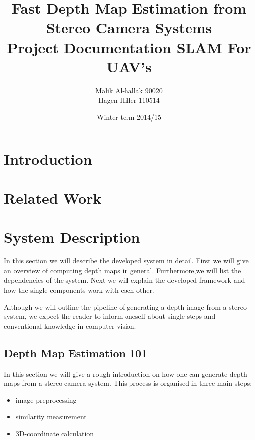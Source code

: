 \documentclass[11pt]{article}
\title{\textbf{Fast Depth Map Estimation from Stereo Camera Systems}\\Project Documentation SLAM For UAV's}
\author{Malik Al-hallak 90020\\
		Hagen Hiller 110514 }
\date{Winter term 2014/15}
\begin{document}
\maketitle



\section{Introduction}
\section{Related Work}
\section{System Description}
In this section we will describe the developed system in detail. First we will give an overview of computing depth maps in general. Furthermore,we will list the dependencies of the system. Next we will explain the developed framework and how the single components work with each other.

Although we will outline the pipeline of generating a depth image from a stereo system, we expect the reader to inform oneself about single steps and conventional knowledge in computer vision.

\subsection{Depth Map Estimation 101}
In this section we will give a rough introduction on how one can generate depth maps from a stereo camera system. This process is organised in three main steps:
\begin{itemize}
	\item image preprocessing
	\item similarity measurement
	\item 3D-coordinate calculation
\end{itemize}
\end{document}
